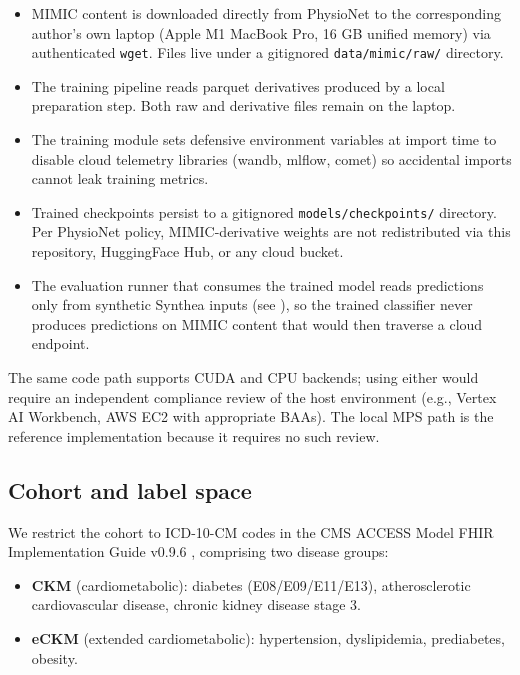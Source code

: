 \begin{itemize}
\tightlist
\item
  MIMIC content is downloaded directly from PhysioNet to the
  corresponding author's own laptop (Apple M1 MacBook Pro, 16 GB
  unified memory) via authenticated \texttt{wget}. Files live under a
  gitignored \texttt{data/mimic/raw/} directory.
\item
  The training pipeline reads parquet derivatives produced by a
  local preparation step. Both raw and derivative files remain on
  the laptop.
\item
  The training module sets defensive environment variables at
  import time to disable cloud telemetry libraries (wandb,
  mlflow, comet) so accidental imports cannot leak training metrics.
\item
  Trained checkpoints persist to a gitignored \texttt{models/checkpoints/}
  directory. Per PhysioNet policy, MIMIC-derivative weights are
  not redistributed via this repository, HuggingFace Hub, or any
  cloud bucket.
\item
  The evaluation runner that consumes the trained model reads
  predictions only from synthetic Synthea inputs (see
  \autocite{FungPhantomCodes2026}), so the trained classifier never produces
  predictions on MIMIC content that would then traverse a cloud
  endpoint.
\end{itemize}

The same code path supports CUDA and CPU backends; using either
would require an independent compliance review of the host
environment (e.g., Vertex AI Workbench, AWS EC2 with appropriate
BAAs). The local MPS path is the reference implementation because
it requires no such review.

\subsection{Cohort and label space}\label{cohort-and-label-space}

We restrict the cohort to ICD-10-CM codes in the CMS ACCESS Model
FHIR Implementation Guide v0.9.6 \autocite{CMS2026}, comprising two disease
groups:

\begin{itemize}
\tightlist
\item
  \textbf{CKM} (cardiometabolic): diabetes (E08/E09/E11/E13),
  atherosclerotic cardiovascular disease, chronic kidney disease
  stage 3.
\item
  \textbf{eCKM} (extended cardiometabolic): hypertension, dyslipidemia,
  prediabetes, obesity.
\end{itemize}

